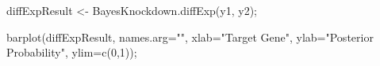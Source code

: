 diffExpResult <- BayesKnockdown.diffExp(y1, y2);

barplot(diffExpResult, names.arg="", xlab="Target Gene",
        ylab="Posterior Probability", ylim=c(0,1));

